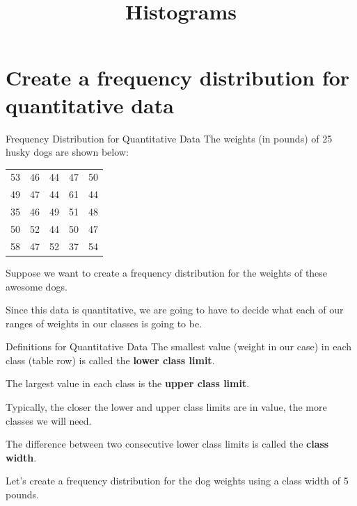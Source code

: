 \documentclass[t]{beamer}
\title{Histograms}
\author{}
\date{}
\begin{document}
\begin{frame} 
\maketitle
\end{frame}

\section{Create a frequency distribution for quantitative data}

\begin{frame}{Frequency Distribution for Quantitative Data}
The weights (in pounds) of 25 husky dogs are shown below:
\begin{center}
\begin{tabular}{ccccc}
53 & 46 & 44 & 47 & 50 \\
49 & 47 & 44 & 61 & 44 \\
35 & 46 & 49 & 51 & 48 \\
50 & 52 & 44 & 50 & 47 \\
58 & 47 & 52 & 37 & 54 \\
\end{tabular}
\end{center}
Suppose we want to create a frequency distribution for the weights of these awesome dogs. \newline\\	\pause

Since this data is quantitative, we are going to have to decide what each of our ranges of weights in our classes is going to be. 
\end{frame}

\begin{frame}{Definitions for Quantitative Data}
The smallest value (weight in our case) in each class (table row) is called the {\color{blue}\textbf{lower class limit}}. \newline\\	\pause

The largest value in each class is the {\color{blue}\textbf{upper class limit}}. \newline\\ \pause 

Typically, the closer the lower and upper class limits are in value, the more classes we will need. \newline\\	\pause

The difference between two consecutive lower class limits is called the {\color{blue}\textbf{class width}}.	\newline\\	\pause

Let's create a frequency distribution for the dog weights using a class width of 5 pounds.
\end{frame}
\end{document}
